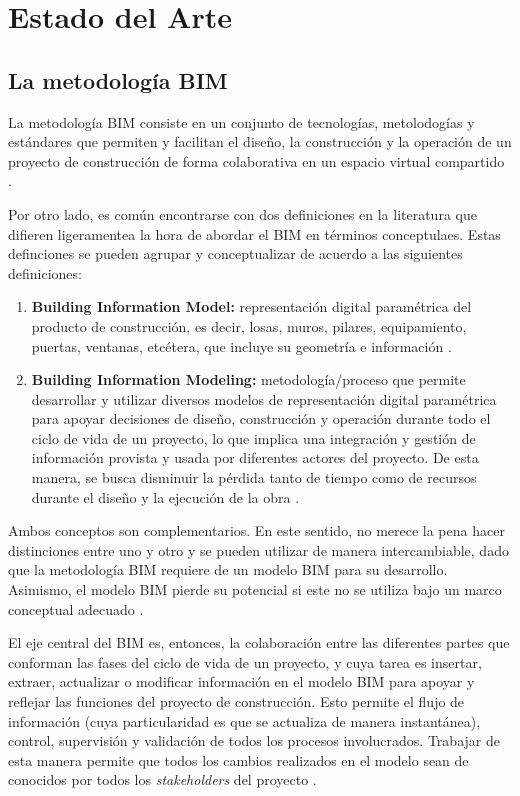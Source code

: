 \chapter{Estado del Arte}

\section{La metodología BIM}

La metodología BIM consiste en un conjunto de tecnologías, metolodogías y estándares que permiten y facilitan el diseño, la construcción y la operación de un proyecto de construcción de forma colaborativa en un espacio virtual compartido \cite{tabilo2019estudio}.

Por otro lado, es común encontrarse con dos definiciones en la literatura que difieren ligeramentea la hora de abordar el BIM en términos conceptulaes. Estas definciones se pueden agrupar y conceptualizar de acuerdo a las siguientes definiciones:

\begin{enumerate}
    \item \textbf{Building Information Model:} representación digital paramétrica del producto de construcción, es decir, losas, muros, pilares, equipamiento, puertas, ventanas, etcétera, que incluye su geometría e información \cite{lnb}.
    \item \textbf{Building Information Modeling:} metodología/proceso  que permite desarrollar y utilizar diversos modelos  de representación digital paramétrica para apoyar decisiones de diseño, construcción y operación durante todo el ciclo de vida de un proyecto, lo que implica una integración y gestión de información provista y usada por diferentes actores del proyecto. De esta manera, se busca disminuir la pérdida tanto de tiempo como de recursos durante el diseño y la ejecución de la obra \cite{bimforum}.
\end{enumerate}

Ambos conceptos son complementarios. En este sentido, no merece la pena hacer distinciones entre uno y otro y se pueden utilizar de manera intercambiable, dado que la metodología BIM requiere de un modelo BIM para su desarrollo. Asimismo, el modelo BIM pierde su potencial si este no se utiliza bajo un marco conceptual adecuado \cite{cardenas2016incorporacion}.

El eje central del BIM es, entonces, la colaboración entre las diferentes partes que conforman las fases del ciclo de vida de un proyecto, y cuya tarea es insertar, extraer, actualizar o modificar información en el modelo BIM para apoyar y reflejar las funciones del proyecto de construcción. Esto permite el flujo de información (cuya particularidad es que se actualiza de manera instantánea), control, supervisión y validación de todos los procesos involucrados. Trabajar de esta manera permite que todos los cambios realizados en el modelo sean de conocidos por todos los \textit{stakeholders} del proyecto \cite{trejo2018estudio}.

